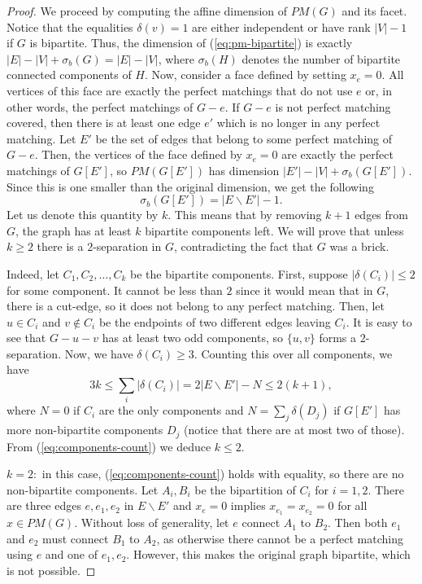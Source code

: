\documentclass[10pt,a4paper]{amsart}
\begin{document}
\begin{proof}
    We proceed by computing the affine dimension of $PM(G)$ and its facet. Notice that the equalities $\delta(v)=1$ are either independent or have rank $|V|-1$ if $G$ is bipartite. Thus, the dimension of (\ref{eq:pm-bipartite}) is exactly $|E|-|V|+\sigma_b(G)=|E|-|V|$, where $\sigma_b(H)$ denotes the number of bipartite connected components of $H$. 
    Now, consider a face defined by setting $x_e=0$. All vertices of this face are exactly the perfect matchings that do not use $e$ or, in other words, the perfect matchings of $G-e$. If $G-e$ is not perfect matching covered, then there is at least one edge $e'$ which is no longer in any perfect matching. Let $E'$ be the set of edges that belong to some perfect matching of $G-e$. Then, the vertices of the face defined by $x_e=0$ are exactly the perfect matchings of $G[E']$, so $PM(G[E'])$ has dimension $|E'|-|V|+\sigma_b(G[E'])$. Since this is one smaller than the original dimension, we get the following \begin{equation*}
        \sigma_b(G[E'])=|E\backslash E'|-1.
    \end{equation*} Let us denote this quantity by $k$. This means that by removing $k+1$ edges from $G$, the graph has at least $k$ bipartite components left. We will prove that unless $k\geq 2$ there is a $2$-separation in $G$, contradicting the fact that $G$ was a brick.

    Indeed, let $C_1, C_2, \ldots, C_k$ be the bipartite components. First, suppose $|\delta(C_i)|\leq 2$ for some component. It cannot be less than $2$ since it would mean that in $G$, there is a cut-edge, so it does not belong to any perfect matching. Then, let $u\in C_i$ and $v\notin C_i$ be the endpoints of two different edges leaving $C_i$. It is easy to see that $G-u-v$ has at least two odd components, so $\{u,v\}$ forms a $2$-separation. Now, we have $\delta(C_i)\geq 3$. Counting this over all components, we have \begin{equation}\label{eq:components-count}
        3k\leq \sum_i |\delta(C_i)|=2|E\backslash E'|-N \leq 2(k+1),
    \end{equation} where $N=0$ if $C_i$ are the only components and $N=\sum_j \delta(D_j)$ if $G[E']$ has more non-bipartite components $D_j$ (notice that there are at most two of those). From (\ref{eq:components-count}) we deduce $k\leq 2$.

    \underline{$k=2:$} in this case, (\ref{eq:components-count}) holds with equality, so there are no non-bipartite components. Let $A_i,B_i$ be the bipartition of $C_i$ for $i=1,2$. There are three edges $e,e_1,e_2$ in $E\backslash E'$ and $x_e=0$ implies $x_{e_1}=x_{e_2}=0$ for all $x \in PM(G)$.
    Without loss of generality, let $e$ connect $A_1$ to $B_2$. Then both $e_1$ and $e_2$ must connect $B_1$ to $A_2$, as otherwise there cannot be a perfect matching using $e$ and one of $e_1, e_2$. However, this makes the original graph bipartite, which is not possible.
    

\end{proof}
\end{document}
